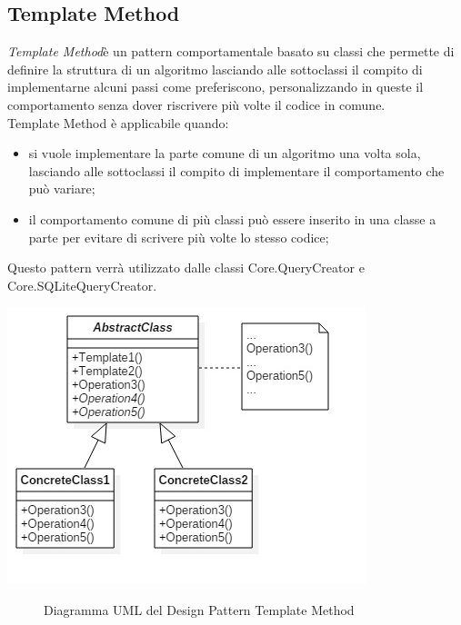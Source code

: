 \documentclass[a4paper,10pt]{report}
\begin{document}
		\subsection{Template Method}
			{\itshape Template Method}è un pattern comportamentale basato su classi
				che  permette di definire la struttura di un algoritmo lasciando alle
				sottoclassi il compito di implementarne alcuni passi come preferiscono,
				personalizzando in queste il comportamento senza dover riscrivere più
				volte il codice in comune.\\
				Template Method è applicabile quando:
			\begin{itemize}
				\item si vuole implementare la parte comune di un algoritmo una
					volta sola, lasciando alle sottoclassi il compito di implementare il
					comportamento che può variare;
				\item il comportamento comune di più classi può essere inserito
					in una classe a parte per evitare di scrivere più volte
					lo stesso codice;
				\end{itemize}
			Questo pattern verrà utilizzato dalle classi Core.QueryCreator
			e Core.SQLiteQueryCreator.
			\begin{center}
				\includegraphics[scale=1]{immagini/TemplateMethod.jpg}
				\end{center}
			\begin{figure}[!h]
					\caption{Diagramma UML del Design Pattern Template Method}
				\end{figure}
		\newpage
\end{document}
